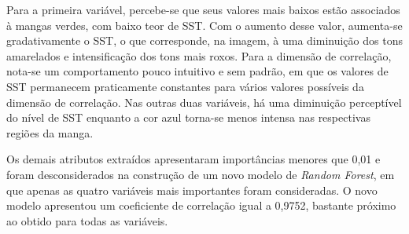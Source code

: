 \begin{figure}[H]
	\label{fig:var_atts}
\end{figure}

Para a primeira variável, percebe-se que seus valores mais baixos estão associados à mangas verdes, com baixo teor de SST. Com o aumento desse valor, aumenta-se gradativamente o SST, o que corresponde, na imagem, à uma diminuição dos tons amarelados e intensificação dos tons mais roxos. Para a dimensão de correlação, nota-se um comportamento pouco intuitivo e sem padrão, em que os valores de SST permanecem praticamente constantes para vários valores possíveis da dimensão de correlação. Nas outras duas variáveis, há uma diminuição perceptível do nível de SST enquanto a cor azul torna-se menos intensa nas respectivas regiões da manga.

Os demais atributos extraídos apresentaram importâncias menores que 0,01 e foram desconsiderados na construção de um novo modelo de \textit{Random Forest}, em que apenas as quatro variáveis mais importantes foram consideradas. O novo modelo apresentou um coeficiente de correlação igual a 0,9752, bastante próximo ao obtido para todas as variáveis.

 

